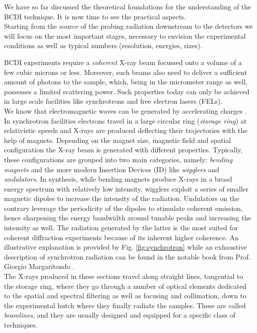 We have so far discussed the theoretical foundations for the understanding of the BCDI technique. It is now time to 
see the practical aspects. \\
Starting from the source of the probing radiation downstream to the detectors we will focus on the most important stages, 
necessary to envision the experimental conditions as well as typical numbers (resolution, energies, sizes).

BCDI experiments require a \textit{coherent} X-ray beam focussed onto a volume of a few cubic microns or less. Moreover, 
such beams also need 
to deliver a sufficient amount of photons to the sample, which, being in the micrometer range as well, possesses a limited scattering 
power. Such properties today can only be achieved in large scale facilities like synchrotrons and free electron lasers (FELs). \\
We know that electromagnetic waves can be generated by accelerating charges \cite{griffiths}. In synchrotron facilities 
electrons travel in a large circular ring (\textit{storage ring}) at relativistic speeds and X-rays are produced deflecting their trajectories 
with the help of magnets. Depending on the magnet size, magnetic field and spatial configuration the X-ray beam is generated 
with different properties. Typically, these configurations are grouped into two main categories, namely: \textit{bending magnets} 
and the more modern Insertion Devices (ID) like \textit{wigglers} and \textit{undulators}. In synthesis, while bending magnets 
produce X-rays in a broad energy spectrum with relatively low intensity, wigglers exploit a series of smaller magnetic dipoles 
to increase the intensity of the radiation. Undulators on the contrary leverage the periodicity of the dipoles to stimulate 
coherent emission, hence sharpening the energy bandwidth around tunable peaks and increasing the intensity as well. 
The radiation generated by the latter is the most suited for coherent diffraction experiments because of its inherent 
higher coherence.
An illustrative explanation is provided by Fig. \ref{fig:synchrotron} while an exhaustive description of synchrotron radiation can be found 
in the notable book from Prof. Giorgio Margaritondo \cite{margaritondo}.\\
The X-rays produced in these sections travel along straight lines, tangential to the storage ring, where they go through 
a number of optical elements dedicated to the spatial and spectral filtering as well as focusing and collimation, down 
to the experimental hutch where they finally radiate the samples. These are called \textit{beamlines}, and they are usually 
designed and equipped for a specific class of techniques. 

